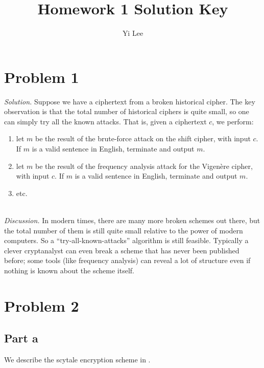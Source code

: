 \documentclass{article}
\title{Homework 1 Solution Key}
\author{Yi Lee}
\begin{document}


\maketitle

\section*{Problem 1}

\noindent \emph{Solution.} Suppose we have a ciphertext from a broken historical cipher. The key observation is that the total number of historical ciphers is quite small, so one can simply try all the known attacks. 
That is, given a ciphertext $c$, we perform:
\begin{enumerate}
    \item let $m$ be the result of the brute-force attack on the shift cipher, with input $c$. If $m$ is a valid sentence in English, terminate and output $m$.
    \item let $m$ be the result of the frequency analysis attack for the Vigen\`ere cipher, with input $c$. If $m$ is a valid sentence in English, terminate and output $m$.
    \item etc.
\end{enumerate}

~\\ \noindent \emph{Discussion.} In modern times, there are many more broken schemes out there, but the total number of them is still quite small relative to the power of modern computers. So a ``try-all-known-attacks'' algorithm is still feasible. Typically a clever cryptanalyst can even break a scheme that has never been published before; some tools (like frequency analysis) can reveal a lot of structure even if nothing is known about the scheme itself.


\section*{Problem 2}

\subsection*{Part a}

We describe the scytale encryption scheme in .
\end{document}
